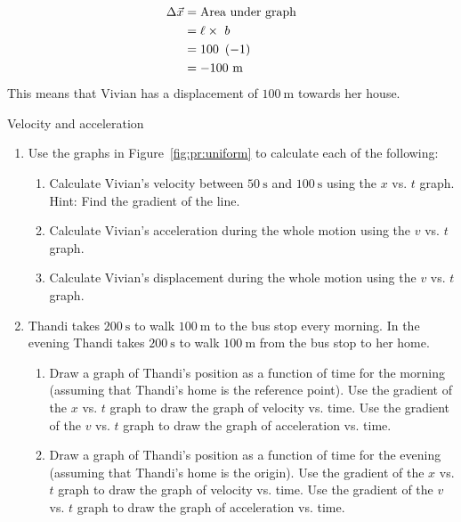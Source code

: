     \begin{align*}
    \Delta \vec{x} &= \text{Area}~\text{under}~\text{graph}\\ 
		   &= \ell \ensuremath{\times}~b\\ 
		    &= 100~\left(-1\right)\hfill \\ 
		  &= -100~\text{m}
      \end{align*}
        \label{m38795*id71010}This means that Vivian has a displacement of $100~\text{m}$ towards her house.\par 
\label{m38795*secfhsst!!!underscore!!!id2587}
\begin{exercises}{Velocity and acceleration }
            \nopagebreak \noindent
        \label{m38795*id71023}\begin{enumerate}[noitemsep, label=\textbf{\arabic*}. ] 
            \label{m38795*uid94}\item Use the graphs in Figure~\ref{fig:pr:uniform} to calculate each of the following:
\label{m38795*id71044}\begin{enumerate}[noitemsep, label=\textbf{\alph*}. ] 
            \label{m38795*uid95}\item Calculate Vivian's velocity between $50~\text{s}$ and $100~\text{s}$ using the $x$ vs. $t$ graph. Hint: Find the gradient of the line.
\label{m38795*uid96}\item Calculate Vivian's acceleration during the whole motion using the $v$ vs. $t$ graph.
\label{m38795*uid97}\item Calculate Vivian's displacement during the whole motion using the $v$ vs. $t$ graph.
\end{enumerate}
                \label{m38795*uid98}\item Thandi takes $200~\text{s}$ to walk $100~\text{m}$ to the bus stop every morning. In the evening Thandi takes $200~\text{s}$ to walk $100~\text{m}$ from the bus stop to her home.\label{m38795*id7103444}\begin{enumerate}[noitemsep, label=\textbf{\alph*}. ] 
            \label{m38795*uid9523}\item  Draw a graph of Thandi's position as a function of time for the morning (assuming that Thandi's home is the reference point). Use the gradient of the $x$ vs. $t$ graph to draw the graph of velocity vs. time. Use the gradient of the $v$ vs. $t$ graph to draw the graph of acceleration vs. time.
\label{m38795*uid99}\item  Draw a graph of Thandi's position as a function of time for the evening (assuming that Thandi's home is the origin). Use the gradient of the $x$ vs. $t$ graph to draw the graph of velocity vs. time. Use the gradient of the $v$ vs. $t$ graph to draw the graph of acceleration vs. time.

\end{enumerate}
\end{enumerate}
\end{exercises}
